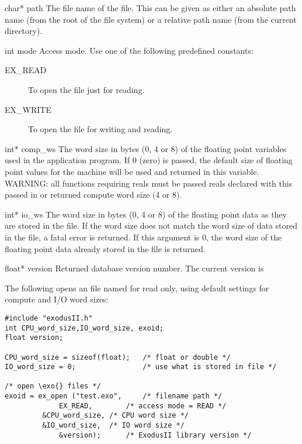 
\begin{parameters}
\item[{char* path \R{}}]
The file name of the \exo{} file. This can be given as either an
absolute path name (from the root of the file system) or a relative
path name (from the current directory).

\item[{int mode \R{}}]
Access mode. Use one of the following predefined constants:

\begin{description}
 \item [EX_READ] To open the file just for reading.

 \item [EX_WRITE] To open the file for writing and reading.
\end{description}

\item[{int* comp_ws \RW{}}]
The word size in bytes (0, 4 or 8) of the floating point variables
used in the application program. If 0 (zero) is passed, the default
size of floating point values for the machine will be used and
returned in this variable. WARNING: all \exo{} functions requiring
reals must be passed reals declared with this passed in or returned
compute word size (4 or 8).


\item[{int* io_ws \RW{}}]
The word size in bytes (0, 4 or 8) of the floating 
point data as they are stored in the \exo{} file. If the word 
size does not match the word size of data stored in the file, 
a fatal error is returned. If this argument is 0, the word size 
of the floating point data already stored in the file is returned.

\item[{float* version \W{}}]
Returned \exo{} database version number. The current version is
\version{}
\end{parameters}

The following opens an \exo{} file named  for read
only, using default settings for compute and I/O word sizes:

\begin{lstlisting}
#include "exodusII.h"
int CPU_word_size,IO_word_size, exoid;
float version;

CPU_word_size = sizeof(float);   /* float or double */
IO_word_size = 0;                /* use what is stored in file */

/* open \exo{} files */
exoid = ex_open ("test.exo",     /* filename path */
	         EX_READ,        /* access mode = READ */
		 &CPU_word_size, /* CPU word size */
		 &IO_word_size,  /* IO word size */
	         &version);      /* ExodusII library version */
\end{lstlisting}


